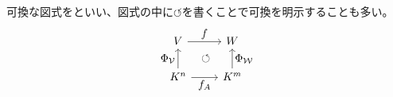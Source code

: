 \documentclass[../../../topic_linear-algebra]{subfiles}
\begin{document}
\br

可換な図式をといい、図式の中に$\circlearrowleft$を書くことで可換を明示することも多い。
\begin{equation*}
  \begin{tikzcd}[every label/.append style = {font = \normalsize}]
    V \arrow[r,"f" name=U] & W \\
    K^n \arrow[u,"{\Phi_{\mathcal{V}}}"] \arrow[r,"f_A"' name=D] & K^m \arrow[u,"{\Phi_{\mathcal{W}}}"']
    \arrow[to path={(U) node[midway] {$\circlearrowleft$}  (D)}]{}
  \end{tikzcd}
\end{equation*}
\end{document}
